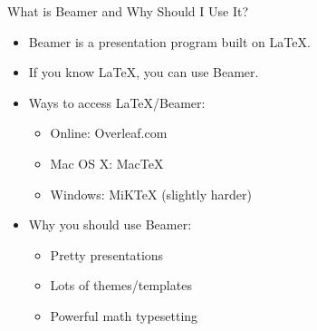 






\begin{frame}
    \titlepage
\end{frame}



\begin{frame}{What is Beamer and Why Should I Use It?}
	\begin{block}{}
		\begin{itemize}[<+->]
		\item Beamer is a presentation program built on \LaTeX.
		\item If you know \LaTeX, you can use Beamer.
		\item Ways to access \LaTeX/Beamer:
		\begin{itemize}
			\item Online: Overleaf.com
			\item Mac OS X: MacTeX
			\item Windows: MiKTeX (slightly harder)
		\end{itemize}
		\item Why you should use Beamer:
		\begin{itemize}
			\item Pretty presentations
			\item Lots of themes/templates
			\item Powerful math typesetting
		\end{itemize}
	\end{itemize}
\end{block}
\end{frame}





